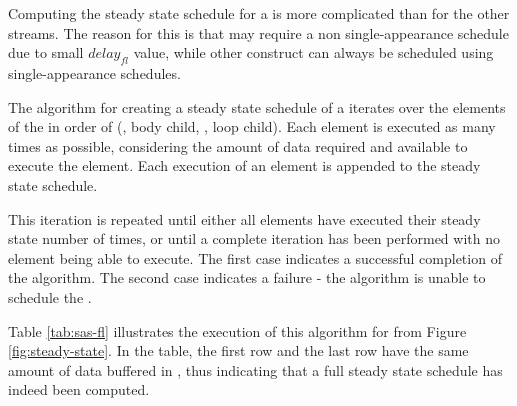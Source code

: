 \begin{comment}
\begin{displaymath}
\begin{array}{rl}
in^i_B = & l_j * u_j - l_B * o_{fl_B} \\
out^i_B = & u^i_{fl_B} + l_B * u_{fl_B} - l_s * o_s\\
in^i_L = & l_s * w_{s, 1} - l_L * o_{fl_L} \\
out^i_L = & delay_{fl} + u^i_{fl_L} + l_L * u_{fl_L} - l_j * w_{j,1} \\
\end{array}
\end{displaymath}
\end{comment}

 Computing the steady
state schedule for a {{\feedbackloop}} is more complicated than
for the other streams.  The reason for this is that
{{\feedbackloops}} may require a non single-appearance schedule
due to small $delay_{fl}$ value, while other {\StreamIt} construct
can always be scheduled using single-appearance schedules.

\begin{comment}
The algorithm used for creating of a steady state schedule
will work in several phases.  The amount of data present in
{{\Channels}} between the children of the {{\feedbackloop}}, the
{\joiner} and the {\splitter} is kept track of to determine which
element is allowed to execute.
\end{comment}

The algorithm for creating a steady state schedule of a
{{\feedbackloop}} iterates over the elements of the {{\feedbackloop}}
in order of ({\joiner}, body child, {\splitter}, loop child). Each
element is executed as many times as possible, considering the
amount of data required and available to execute the element. Each
execution of an element is appended to the steady state schedule.

This iteration is repeated until either all elements have executed
their steady state number of times, or until a complete iteration
has been performed with no element being able to execute. The
first case indicates a successful completion of the algorithm. The
second case indicates a failure - the algorithm is unable to
schedule the {{\feedbackloop}}.

Table \ref{tab:sas-fl} illustrates the execution of this algorithm
for {{\feedbackloop}} from Figure \ref{fig:steady-state}. In the
table, the first row and the last row have the same amount of data
buffered in {{\Channels}}, thus indicating that a full steady
state schedule has indeed been computed.
\begin{comment}
Furthermore, the last entry considering execution of $B$ has
sufficient data to execute $B$ 5 times, but only executes it 4
times to ensure that a steady state schedule is constructed.
\end{comment}

